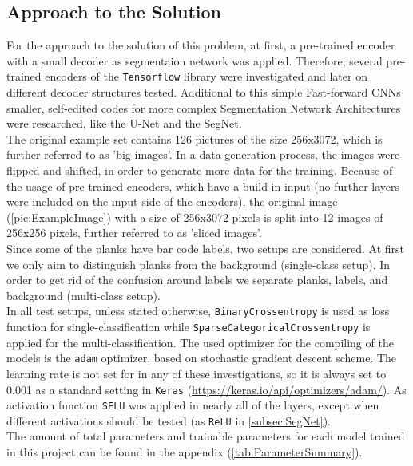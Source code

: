 \subsection{Approach to the Solution}
For the approach to the solution of this problem, at first, a pre-trained encoder with a small decoder as segmentaion network was applied. Therefore, several pre-trained encoders of the \verb|Tensorflow| library were investigated and later on different decoder structures tested. Additional to this simple Fast-forward CNNs \cite{JonathanLong.} smaller, self-edited codes for more complex Segmentation Network Architectures were researched, like the U-Net\cite{Ronneberger.2015} and the SegNet\cite{Badrinarayanan.2017}.\\
The original example set contains 126 pictures of the size 256x3072, which is further referred to as 'big images'. In a data generation process, the images were flipped and shifted, in order to generate more data for the training. Because of the usage of pre-trained encoders, which have a build-in input (no further layers were included on the input-side of the encoders), the original image (\ref{pic:ExampleImage}) with a size of 256x3072 pixels is split into 12 images of 256x256 pixels, further referred to as 'sliced images'.\\
Since some of the planks have bar code labels, two setups are considered. At first we only aim to distinguish planks from the background (single-class setup). In order to get rid of the confusion around labels we separate planks, labels, and background (multi-class setup).\\
In all test setups, unless stated otherwise, \verb|BinaryCrossentropy| is used as loss function for single-classification while \verb|SparseCategoricalCrossentropy| is applied for the multi-classification. The used optimizer for the compiling of the models is the \verb|adam| optimizer, based on stochastic gradient descent scheme. The learning rate is not set for in any of these investigations, so it is always set to 0.001 as a standard setting in \verb|Keras| (\url{https://keras.io/api/optimizers/adam/}). As activation function \verb|SELU| was applied in nearly all of the layers, except when different activations should be tested (as \verb|ReLU| in \cref{subsec:SegNet}).\\
The amount of total parameters and trainable parameters for each model trained in this project can be found in the appendix (\cref{tab:ParameterSummary}).